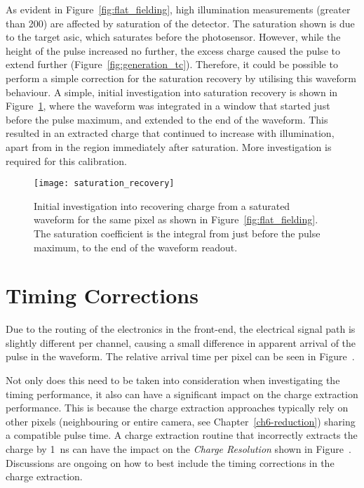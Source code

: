 As evident in Figure~\ref{fig:flat_fielding}, high illumination measurements (greater than \utilde\SI{200}{\pe}) are affected by saturation of the detector. The saturation shown is due to the \gls{target} \gls{asic}, which saturates before the photosensor. However, while the height of the pulse increased no further, the excess charge caused the pulse to extend further (Figure~\ref{fig:generation_tc}). Therefore, it could be possible to perform a simple correction for the saturation recovery by utilising this waveform behaviour. A simple, initial investigation into saturation recovery is shown in Figure~\ref{fig:saturation_recovery}, where the waveform was integrated in a window that started just before the pulse maximum, and extended to the end of the waveform. This resulted in an extracted charge that continued to increase with illumination, apart from in the region immediately after saturation. More investigation is required for this calibration.

\begin{figure}[H]
	\centering
    \texttt{[image: saturation\_recovery]} 
	\caption[Saturation Recovery.]{Initial investigation into recovering charge from a saturated waveform for the same pixel as shown in Figure~\ref{fig:flat_fielding}. The saturation coefficient is the integral from just before the pulse maximum, to the end of the waveform readout.}
	\label{fig:saturation_recovery}
\end{figure}

\section{Timing Corrections} \label{section:timing_corrections}

Due to the routing of the electronics in the front-end, the electrical signal path is slightly different per channel, causing a small difference in apparent arrival of the pulse in the waveform. The relative arrival time per pixel can be seen in Figure~. 

Not only does this need to be taken into consideration when investigating the timing performance, it also can have a significant impact on the charge extraction performance. This is because the charge extraction approaches typically rely on other pixels (neighbouring or entire camera, see Chapter~\ref{ch6-reduction}) sharing a compatible pulse time. A charge extraction routine that incorrectly extracts the charge by \SI{1}{ns} can have the impact on the \textit{Charge Resolution} shown in Figure~. Discussions are ongoing on how to best include the timing corrections in the charge extraction.

